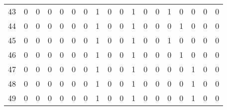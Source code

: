 \begin{tabular}{|c|c|c|c|c|c|c|c|c|c|c|c|c|c|c|c|c|c|}
43    &    0 &    0 &    0 &   0 &        0 &        0 &    1 &    0 &    0 &    1 &    0 &    0 &    1 &    0 &     0 &    0 &     0 \\
44    &    0 &    0 &    0 &   0 &        0 &        0 &    1 &    0 &    0 &    1 &    0 &    0 &    0 &    1 &     0 &    0 &     0 \\
45    &    0 &    0 &    0 &   0 &        0 &        0 &    1 &    0 &    0 &    1 &    0 &    0 &    1 &    0 &     0 &    0 &     0 \\
46    &    0 &    0 &    0 &   0 &        0 &        0 &    1 &    0 &    0 &    1 &    0 &    0 &    0 &    1 &     0 &    0 &     0 \\
47    &    0 &    0 &    0 &   0 &        0 &        0 &    1 &    0 &    0 &    1 &    0 &    0 &    0 &    0 &     1 &    0 &     0 \\
48    &    0 &    0 &    0 &   0 &        0 &        0 &    1 &    0 &    0 &    1 &    0 &    0 &    0 &    0 &     1 &    0 &     0 \\
49    &    0 &    0 &    0 &   0 &        0 &        0 &    1 &    0 &    0 &    1 &    0 &    0 &    0 &    0 &     1 &    0 &     0 \\
\bottomrule
\end{tabular}
